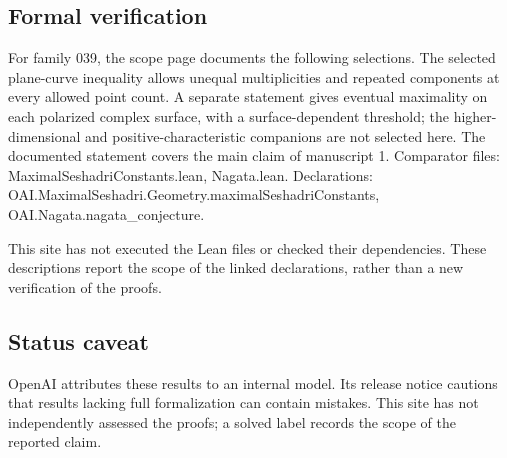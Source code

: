 \documentclass[11pt]{article}
\begin{document}
\subsection{Formal verification}
For family 039, the scope page documents the following selections. The selected plane-curve inequality allows unequal multiplicities and repeated components at every allowed point count. A separate statement gives eventual maximality on each polarized complex surface, with a surface-dependent threshold; the higher-dimensional and positive-characteristic companions are not selected here. The documented statement covers the main claim of manuscript 1. Comparator files: MaximalSeshadriConstants.lean, Nagata.lean. Declarations: OAI.MaximalSeshadri.Geometry.maximalSeshadriConstants, OAI.Nagata.nagata\_conjecture.

This site has not executed the Lean files or checked their dependencies. These descriptions report the scope of the linked declarations, rather than a new verification of the proofs.

\subsection{Status caveat}
OpenAI attributes these results to an internal model. Its release notice cautions that results lacking full formalization can contain mistakes. This site has not independently assessed the proofs; a solved label records the scope of the reported claim.
\end{document}
